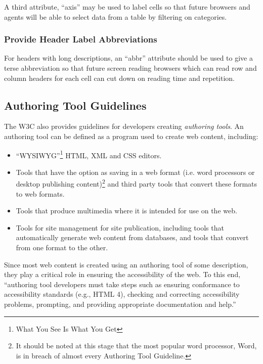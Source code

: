 A third attribute, ``axis'' may be used to label cells so that future browsers
and agents will be able to select data from a table by filtering on 
categories.

\subsubsection{Provide Header Label Abbreviations}

For headers with long descriptions, an ``abbr'' attribute should be used to
give a terse abbreviation so that future screen reading browsers which can read
row and column headers for each cell can cut down on reading time and
repetition.

\subsection{Authoring Tool Guidelines}

The W3C also provides guidelines for developers creating \emph{authoring
tools}\cite{w3c:atag}. An authoring tool can be defined as a program used
to create web content, including:

\begin{itemize}

\item ``WYSIWYG''\footnote{What You See Is What You Get} HTML, XML and CSS
editors.

\item Tools that have the option as saving in a web format (i.e. word 
processors or desktop publishing content)\footnote{It should be noted at
this stage that the most popular word processor, Word, is in breach of 
almost every Authoring Tool Guideline.} and third party tools that
convert these formats to web formats.

\item Tools that produce multimedia where it is intended for use on
the web.

\item Tools for site management for site publication, including tools
that automatically generate web content from databases, and tools
that convert from one format to the other.

\end{itemize}

Since most web content is created using an authoring tool of some description,
they play a critical role in ensuring the accessibility of the web. To this
end, ``authoring tool developers must take steps such as ensuring conformance
to accessibility standards (e.g., HTML 4), checking and correcting accessibility
problems, prompting, and providing appropriate documentation and help.''

